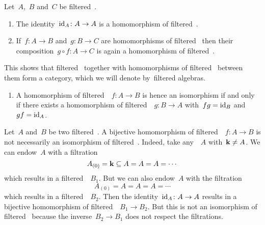 \begin{remark}
  Let~$A$,~$B$ and~$C$ be filtered~\algebras{$\kf$}.
  \begin{enumerate}
    \item
      The identity~$\operatorname{id}_A \colon A \to A$ is a homomorphism of filtered~\algebras{$\kf$}.
    \item
      If~$f \colon A \to B$ and~$g \colon B \to C$ are homomorphisms of filtered~\algebras{$\kf$} then their composition~$g \circ f \colon A \to C$ is again a homomorphism of filtered~\algebras{$\kf$}.
  \end{enumerate}
  This shows that filtered~\algebras{$\kf$} together with homomorphisms of filtered~\algebras{$\kf$} between them form a category, which we will denote by~\gls*{filtered algebras}.
  \begin{enumerate}[start=3]
    \item
      A homomorphism of filtered~{\algebras{$\kf$}}~$f \colon A \to B$ is hence an isomorphism if and only if there exists a homomorphism of filtered~{\algebras{$\kf$}}~$g \colon B \to A$ with~$fg = \operatorname{id}_B$ and~$gf = \operatorname{id}_A$.
  \end{enumerate}
\end{remark}


\begin{warning}
  Let~$A$ and~$B$ be two filtered~{\algebras{$\kf$}}.
  A bijective homomorphism of filtered~{\algebras{$\kf$}}~$f \colon A \to B$ is not necessarily an isomorphism of filtered~{\algebras{$\kf$}}.
  Indeed, take any~{\algebra{$\kf$}}~$A$ with~$\mathbf{k} \neq A$.
  We can endow~$A$ with a filtration
  \[
    A_{(0)}
    =
    \mathbf{k}
    \subseteq
    A
    =
    A
    =
    A
    =
    \dotsb
  \]
  which results in a filtered~{\algebra{$\kf$}}~$B_1$.
  But we can also endow~$A$ with the filtration
  \[
    A_{(0)}
    =
    A
    =
    A
    =
    A
    =
    \dotsb
  \]
  which results in a filtered~{\algebra{$\kf$}}~$B_2$.
  Then the identity~$\operatorname{id}_A \colon A \to A$  results in a bijective homomorphism of filtered~{\algebras{$\kf$}}~$B_1 \to B_2$.
  But this is not an isomorphism of filtered~{\algebras{$\kf$}} because the inverse~$B_2 \to B_1$ does not respect the filtrations.
\end{warning}


